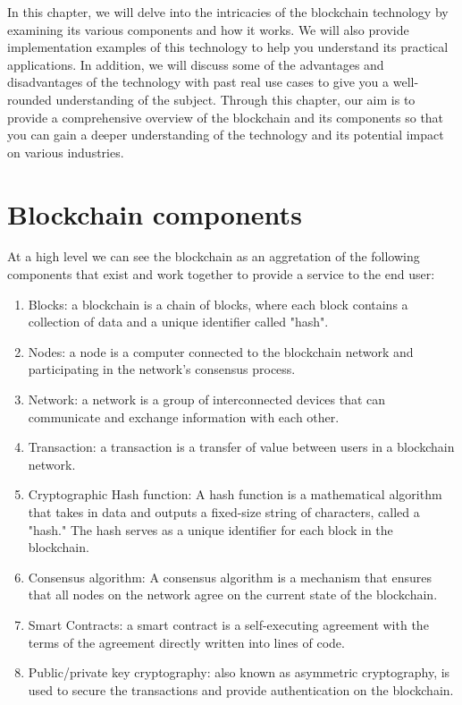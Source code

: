 \documentclass[target=mst,aauheader=]{thud}
\begin{document}
\indent In this chapter, we will delve into the intricacies of the blockchain technology by examining its various components and how it works. We will also provide implementation examples of this technology to help you understand its practical applications. In addition, we will discuss some of the advantages and disadvantages of the technology with past real use cases to give you a well-rounded understanding of the subject. Through this chapter, our aim is to provide a comprehensive overview of the blockchain and its components so that you can gain a deeper understanding of the technology and its potential impact on various industries.

\section{Blockchain components}

At a high level we can see the blockchain as an aggretation of the following components that exist and work together to provide a service to the end user:

\begin{enumerate}

    \item Blocks: a blockchain is a chain of blocks, where each block contains a collection of data and a unique identifier called "hash".
    \item Nodes: a node is a computer connected to the blockchain network and participating in the network's consensus process.
    \item Network: a network is a group of interconnected devices that can communicate and exchange information with each other.
    \item Transaction: a transaction is a transfer of value between users in a blockchain network.
    \item Cryptographic Hash function: A hash function is a mathematical algorithm that takes in data and outputs a fixed-size string of characters, called a "hash." The hash serves as a unique identifier for each block in the blockchain.
    \item Consensus algorithm: A consensus algorithm is a mechanism that ensures that all nodes on the network agree on the current state of the blockchain.
    \item Smart Contracts: a smart contract is a self-executing agreement with the terms of the agreement directly written into lines of code.
    \item Public/private key cryptography: also known as asymmetric cryptography, is used to secure the transactions and provide authentication on the blockchain.

\end{enumerate}
\end{document}
